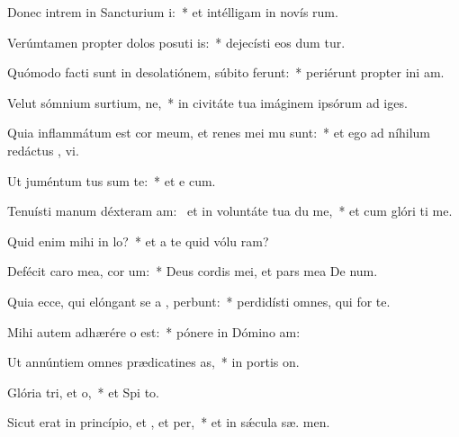 \item Donec intrem in Sancturium i:~* et intélligam in novís rum.
\item Verúmtamen propter dolos posuti is:~* dejecísti eos dum tur.
\item Quómodo facti sunt in desolatiónem, súbito ferunt:~* periérunt propter ini am.
\item Velut sómnium surtium, ne,~* in civitáte tua imáginem ipsórum ad  iges.
\item Quia inflammátum est cor meum, et renes mei mu sunt:~* et ego ad níhilum redáctus ,  vi.
\item Ut juméntum tus sum  te:~* et e  cum.
\item Tenuísti manum déxteram am:~\pscross{} et in voluntáte tua du me,~* et cum glóri ti me.
\item Quid enim mihi  in lo?~* et a te quid vólu  ram?
\item Defécit caro mea,  cor um:~* Deus cordis mei, et pars mea De  num.
\item Quia ecce, qui elóngant se a , perbunt:~* perdidísti omnes, qui for  te.
\item Mihi autem adhærére o  est:~* pónere in Dómino   am:
\item Ut annúntiem omnes prædicatines as,~* in portis  on.
\item Glória tri, et o,~* et Spi to.
\item Sicut erat in princípio, et , et per,~* et in sǽcula sæ. men.
